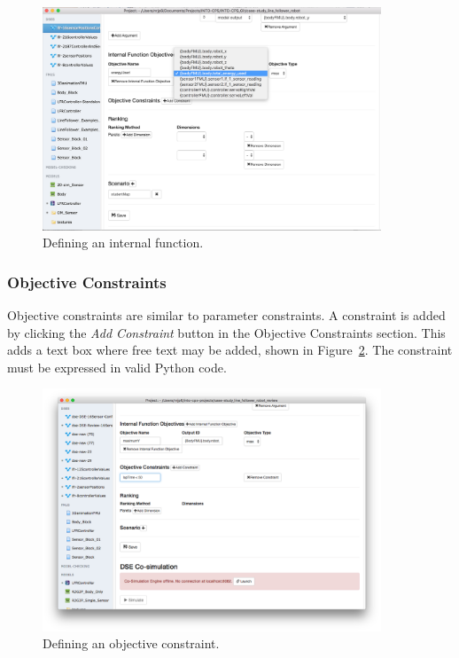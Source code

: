 \begin{figure}[ht]
	\centering
	\includegraphics[width=0.9\textwidth]{figures/dse/app-internal}
	\caption{Defining an internal function.}\label{fig:dse:edit:app-internal}
\end{figure}
%
%
%
\subsubsection{Objective Constraints}\label{sec:dse:app:objectiveconstraint}
Objective constraints are similar to parameter constraints. A constraint is added by clicking the \textit{Add Constraint} button in the Objective Constraints section.  This adds a text box where free text may be added, shown in Figure~\ref{fig:dse:edit:app-obj-const}.  The constraint must be expressed in valid Python code.
%
%
%
\begin{figure}[ht]
	\centering
	\includegraphics[width=0.9\textwidth]{figures/dse/app-obj-const}
	\caption{Defining an objective constraint.}\label{fig:dse:edit:app-obj-const}
\end{figure}
%
%
%
